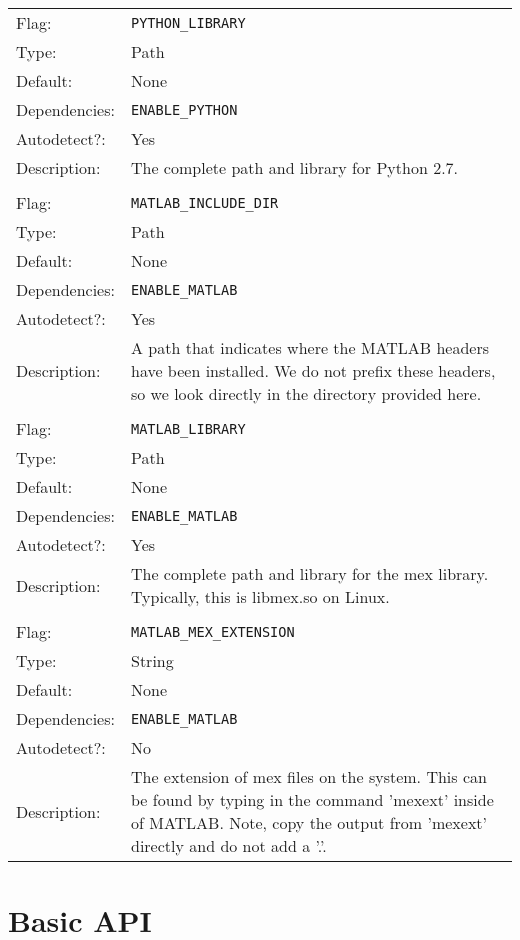 \documentclass{report}
\begin{document}
\begin{center}
\begin{longtable}{lp{}}
Flag:         &\texttt{PYTHON\_LIBRARY}\\
Type:         &Path \\
Default:      &None \\
Dependencies: &\texttt{ENABLE\_PYTHON}\\
Autodetect?:  &Yes \\
Description:  &The complete path and library for Python 2.7. \\
\\
Flag:         &\texttt{MATLAB\_INCLUDE\_DIR} \\
Type:         &Path \\
Default:      &None \\
Dependencies: &\texttt{ENABLE\_MATLAB}\\
Autodetect?:  &Yes \\
Description:  &A path that indicates where the MATLAB headers have been 
              installed.  We do not prefix these headers, so we look directly
              in the directory provided here.\\
\\
Flag:         &\texttt{MATLAB\_LIBRARY}\\
Type:         &Path \\
Default:      &None \\
Dependencies: &\texttt{ENABLE\_MATLAB}\\
Autodetect?:  &Yes \\
Description:  &The complete path and library for the mex library.  Typically,
              this is libmex.so on Linux.\\
\\
Flag:         &\texttt{MATLAB\_MEX\_EXTENSION}\\
Type:         &String \\
Default:      &None \\
Dependencies: &\texttt{ENABLE\_MATLAB}\\
Autodetect?:  &No \\
Description:  &The extension of mex files on the system.  This can be found
              by typing in the command 'mexext' inside of MATLAB.  Note, copy
              the output from 'mexext' directly and do not add a '.'.
\end{longtable}
\end{center}
       
\chapter{Basic API}\label{ch:Basic}
\end{document}

